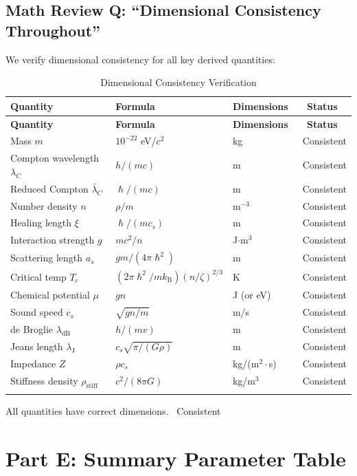 \documentclass[11pt,a4paper]{article}
\newcommand{\hbar}{\ensuremath{\hslash}}
\newcommand{\kB}{\ensuremath{k_{\mathrm{B}}}}
\newcommand{\lambdadB}{\ensuremath{\lambda_{\mathrm{dB}}}}
\newcommand{\lambdaJ}{\ensuremath{\lambda_{\mathrm{J}}}}
\newcommand{\CONSISTENT}{\textcolor{green!60!black}{\checkmark~Consistent}}
\begin{document}
\subsection{Math Review Q: ``Dimensional Consistency Throughout''}

We verify dimensional consistency for all key derived quantities:

\begin{longtable}{@{}p{4cm}p{4cm}p{4cm}c@{}}
\toprule
\textbf{Quantity} & \textbf{Formula} & \textbf{Dimensions} & \textbf{Status} \\
\midrule
\endfirsthead
\toprule
\textbf{Quantity} & \textbf{Formula} & \textbf{Dimensions} & \textbf{Status} \\
\midrule
\endhead
Mass $m$ & $10^{-22}$ eV/$c^2$ & kg & \CONSISTENT \\
Compton wavelength $\lambda_C$ & $h/(mc)$ & m & \CONSISTENT \\
Reduced Compton $\bar{\lambda}_C$ & $\hbar/(mc)$ & m & \CONSISTENT \\
Number density $n$ & $\rho/m$ & m$^{-3}$ & \CONSISTENT \\
Healing length $\xi$ & $\hbar/(mc_s)$ & m & \CONSISTENT \\
Interaction strength $g$ & $mc^2/n$ & J$\cdot$m$^3$ & \CONSISTENT \\
Scattering length $a_s$ & $gm/(4\pi\hbar^2)$ & m & \CONSISTENT \\
Critical temp $T_c$ & $(2\pi\hbar^2/m\kB)(n/\zeta)^{2/3}$ & K & \CONSISTENT \\
Chemical potential $\mu$ & $gn$ & J (or eV) & \CONSISTENT \\
Sound speed $c_s$ & $\sqrt{gn/m}$ & m/s & \CONSISTENT \\
de Broglie $\lambdadB$ & $h/(mv)$ & m & \CONSISTENT \\
Jeans length $\lambdaJ$ & $c_s\sqrt{\pi/(G\rho)}$ & m & \CONSISTENT \\
Impedance $Z$ & $\rho c_s$ & kg/(m$^2\cdot$s) & \CONSISTENT \\
Stiffness density $\rho_{\mathrm{stiff}}$ & $c^2/(8\pi G)$ & kg/m$^3$ & \CONSISTENT \\
\bottomrule
\caption{Dimensional Consistency Verification}
\label{tab:dimensions}
\end{longtable}

All quantities have correct dimensions. \CONSISTENT

\section{Part E: Summary Parameter Table}
\label{sec:partE}
\end{document}

